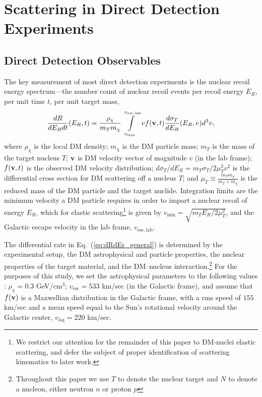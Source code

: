 \documentclass[11pt]{article}
\newcommand{\Eq}[1]{Eq.~(\ref{#1})} \newcommand{\Eqs}[2]{Eqs.~(\ref{#1}) and (\ref{#2})} \newcommand{\Eqm}[2]{Eqs.~(\ref{#1}) through (\ref{#2})}
\begin{document}
  

\section{Scattering in Direct Detection Experiments}\label{sec:dd}

\subsection{Direct Detection Observables}

The key measurement of most direct detection experiments is the nuclear recoil energy spectrum---the number count of nuclear recoil events per recoil energy $E_R$, per unit time $t$, per unit target mass,
\begin{equation}
\frac{dR}{dE_R dt}(E_R,t) =  \frac{\rho_\chi}{m_T m_\chi} \int\limits_{v_{\mathrm{min}}}^{v_{\mathrm{esc, lab}}}  v f(\mathrm{\mbox{\bf{v}}},t) \frac{d\sigma_T}{dE_R} (E_R,v) d^3v ,
\label{eq:dRdEr_general}
\end{equation}
where $\rho_\chi$ is the local DM density; $m_\chi$ is the DM particle mass; $m_T$ is the mass of the target nucleus $T$; $\mathrm{\mbox{\bf{v}}}$ is DM velocity vector of magnitude $v$ (in the lab frame); $f(\mathrm{\mbox{\bf{v}}}, t)$ is the observed DM velocity distribution; $d\sigma_T/dE_R=m_T \sigma_T /2\mu_T^2 v^2$ is the differential cross section for DM scattering off a nucleus $T$; and $\mu_T\equiv\frac{m_Tm_\chi}{m_T+m_\chi}$ is the reduced mass of the DM particle and the target nuclide. Integration limits are the minimum velocity a DM particle requires in order to impart a nuclear recoil of energy $E_R$, which for elastic scattering\footnote{We restrict our attention for the remainder of this paper to DM-nuclei elastic scattering, and defer the subject of proper identification of scattering kinematics to later work.} is given by $v_\mathrm{min} = \sqrt{m_T E_R/2\mu_T^2}$, and the Galactic escape velocity in the lab frame, $v_{\mathrm{esc, lab}}$.

The differential rate in \Eq{eq:dRdEr_general} is determined by the experimental setup, the DM astrophysical and particle properties, the nuclear properties of the target material, and the DM--nucleus interaction.\footnote{Throughout this paper we use $T$ to denote the nuclear target and $N$ to denote a nucleon, either neutron $n$ or proton $p$} For the purposes of this study, we set the astrophysical parameters to the following values \cite{Bovy:2013raa,Piffl:2013mla}: $\rho_\chi=0.3$ GeV/cm$^3$; $v_{\mathrm{esc}} = 533$ km/sec (in the Galactic frame), and assume that $f(\mathrm{\mbox{\bf{v}}})$ is a Maxwellian distribution in the Galactic frame, with a rms speed of $155$ km/sec and a mean speed equal to the Sun's rotational velocity around the Galactic center, $v_\textrm{lag}=220$ km/sec.
\end{document}
